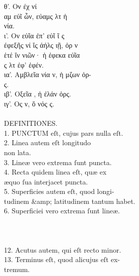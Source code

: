 \begin{typeLatin}
θ'. Ον   έχ  νί  \\
αμ εὐῖ ὦν, εὐαμς λτ ἡ  \\
νία. \\
ι'. Ον  εὐῖα ἐπ' εὐῖ ῖ ς  \\
ἐφεξῆς νί ἴς ἀήλς ιῇ, ὀρ ν  \\
ἑτέ  ἴν νιῶν·  ἡ ἐφεκα εὐῖα  \\
ς λτ ἐφ'  ἐφέν. \\
ια'. Αμβλεῖα νία ν, ἡ μζων ὀρ-  \\
ς. \\
ιβ'. Οξεῖα , ἡ ἐλάν ὀρς. \\
ιγ'. Ος ν, ὅ νός  ς. \\
\\
DEFINITIONES.\\
1. PUNCTUM eſt, cujus pars nulla eſt.\\
2. Linea autem eſt longitudo \\
non lata.\\
3. Lineæ vero extrema ſunt puncta.\\
4. Recta quidem linea eſt, quæ ex \\
æquo ſua interjacet puncta.\\
5. Superficies autem eſt, quod longi- \\
tudinem &amp; latitudinem tantum habet.\\
6. Superficiei vero extrema ſunt lineæ.\\
\\\untranscribedText \\ \\
12. Acutus autem, qui eſt recto minor.\\
13. Terminus eſt, quod alicujus eſt ex- \\
tremum.\\
\end{typeLatin}

